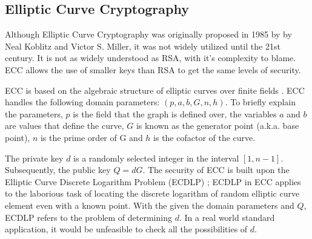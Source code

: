 \subsection{Elliptic Curve Cryptography}

Although Elliptic Curve Cryptography was originally proposed in 1985 by by Neal Koblitz and Victor S. Miller, it was not widely utilized until the 21st century. It is not as widely understood as RSA, with it's complexity to blame. ECC allows the use of smaller keys than RSA to get the same levels of security. 

ECC is based on the algebraic structure of elliptic curves over finite fields \cite{RSA_ECC}. ECC handles the following domain parameters: \((p,a,b,G,n,h)\). To briefly explain the parameters, \(p\) is the field that the graph is defined over, the variables \(a\) and \(b\) are values that define the curve, \(G\) is known as the generator point (a.k.a. base point), \(n\) is the prime order of G and \(h\) is the cofactor of the curve.

The private key \(d\) is a randomly selected integer in the interval \( [ 1 , n - 1 ]\). Subsequently, the public key \(Q=dG\). The security of ECC is built upon the Elliptic Curve Discrete Logarithm Problem (ECDLP) \cite{RSA_ECC}; ECDLP in ECC applies to the laborious task of locating the discrete logarithm of random elliptic curve element even with a known point. With the given the domain parameters and \(Q\), ECDLP refers to the problem of determining \(d\). In a real world standard application, it would be unfeasible to check all the possibilities of \(d\).